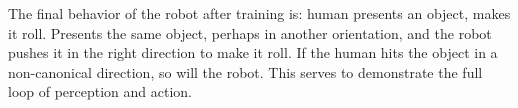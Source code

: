 The final behavior of the robot after training is: human presents an
object, makes it roll.  Presents the same object, perhaps in another
orientation, and the robot pushes it in the right direction to make it
roll.  If the human hits the object in a non-canonical direction,
so will the robot.  This serves to demonstrate the full loop of 
perception and action.



